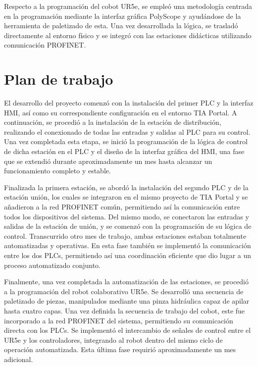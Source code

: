 Respecto a la programación del cobot UR5e, se empleó una metodología centrada en la programación mediante la interfaz gráfica PolyScope y ayudándose de la herramienta de paletizado de esta. Una vez desarrollada la lógica, se trasladó directamente al entorno físico y se integró con las estaciones didácticas utilizando comunicación PROFINET.

\section{Plan de trabajo}
\label{sec:plantrabajo}

El desarrollo del proyecto comenzó con la instalación del primer PLC y la interfaz HMI, así como su correspondiente configuración en el entorno TIA Portal. A continuación, se procedió a la instalación de la estación de distribución, realizando el conexionado de todas las entradas y salidas al PLC para su control. Una vez completada esta etapa, se inició la programación de la lógica de control de dicha estación en el PLC y el diseño de la interfaz gráfica del HMI, una fase que se extendió durante aproximadamente un mes hasta alcanzar un funcionamiento completo y estable.

Finalizada la primera estación, se abordó la instalación del segundo PLC y de la estación unión, los cuales se integraron en el mismo proyecto de TIA Portal y se añadieron a la red PROFINET común, permitiendo así la comunicación entre todos los dispositivos del sistema. Del mismo modo, se conectaron las entradas y salidas de la estación de unión, y se comenzó con la programación de su lógica de control. Transcurrido otro mes de trabajo, ambas estaciones estaban totalmente automatizadas y operativas. En esta fase también se implementó la comunicación entre los dos PLCs, permitiendo así una coordinación eficiente que dio lugar a un proceso automatizado conjunto.

Finalmente, una vez completada la automatización de las estaciones, se procedió a la programación del robot colaborativo UR5e. Se desarrolló una secuencia de paletizado de piezas, manipulados mediante una pinza hidráulica capaz de apilar hasta cuatro capas. Una vez definida la secuencia de trabajo del cobot, este fue incorporado a la red PROFINET del sistema, permitiendo su comunicación directa con los PLCs. Se implementó el intercambio de señales de control entre el UR5e y los controladores, integrando al robot dentro del mismo ciclo de operación automatizada. Esta última fase requirió aproximadamente un mes adicional.

